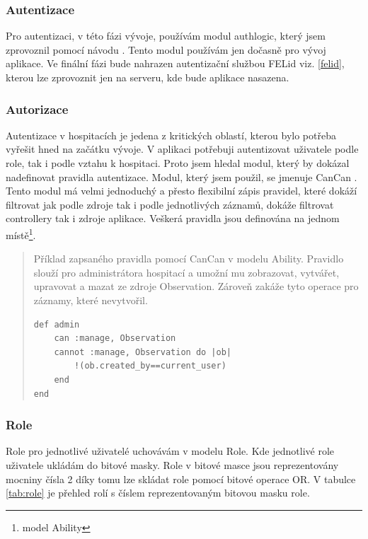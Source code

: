 \subsubsection{Autentizace}
Pro autentizaci, v této fázi vývoje, používám modul authlogic, který jsem zprovoznil pomocí návodu \cite{authlogic}. Tento modul používám jen dočasně pro vývoj aplikace. Ve finální fázi bude nahrazen autentizační službou FELid viz. \ref{felid}, kterou lze zprovoznit jen na serveru, kde bude aplikace nasazena. 

\subsubsection{Autorizace}
Autentizace v hospitacích je jedena z kritických oblastí, kterou bylo potřeba vyřešit hned na začátku vývoje. V aplikaci potřebuji autentizovat uživatele podle role, tak i podle vztahu k hospitaci. Proto jsem hledal modul, který by dokázal nadefinovat pravidla autentizace. Modul, který jsem použil, se jmenuje CanCan \cite{cancan} . Tento modul má velmi jednoduchý a přesto flexibilní zápis pravidel, které dokáží filtrovat jak podle zdroje tak i podle jednotlivých záznamů, dokáže filtrovat controllery tak i zdroje aplikace.  Veškerá pravidla jsou definována na jednom místě\footnote{model Ability}.

\begin{quote}
Příklad zapsaného pravidla pomocí CanCan v modelu Ability. Pravidlo slouží pro administrátora hospitací a umožní mu zobrazovat, vytvářet, upravovat a mazat ze zdroje Observation. Zároveň zakáže tyto operace pro záznamy, které nevytvořil.

\begin{verbatim}
def admin
    can :manage, Observation
    cannot :manage, Observation do |ob|
        !(ob.created_by==current_user)
    end
end
\end{verbatim} 
\end{quote}

\subsubsection{Role}
\label{sec:role}
Role pro jednotlivé uživatelé uchovávám v modelu Role. Kde jednotlivé role uživatele ukládám do bitové masky. Role v bitové masce jsou reprezentovány mocniny čísla 2 díky tomu lze skládat role pomocí bitové operace OR. V tabulce \ref{tab:role} je přehled rolí s číslem reprezentovaným bitovou masku role.

